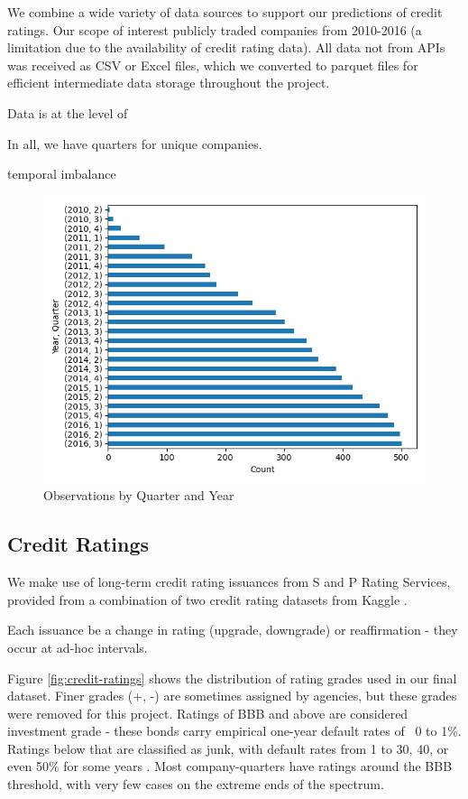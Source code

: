 \documentclass{article}
\begin{document}
    We combine a wide variety of data sources to support our predictions of credit ratings. Our scope of interest publicly traded companies from 2010-2016 (a limitation due to the availability of credit rating data). All data not from APIs was received as CSV or Excel files, which we converted to parquet files for efficient intermediate data storage throughout the project.

    Data is at the level of

    In all, we have \numQuarters \space quarters for \numCompanies \space unique companies.

    temporal imbalance

    \begin{figure}[h!]
		\centering
        \caption{Observations by Quarter and Year}
        \includegraphics[width=0.5\linewidth,keepaspectratio=true]{../Output/All Data EDA/Tabular EDA/all_data_fixed_quarter_dates_obs_by_year_quarter_no_title.png}
	\end{figure}

    \subsection*{Credit Ratings}

    We make use of long-term credit rating issuances from S and P Rating Services, provided from a combination of two credit rating datasets from Kaggle \citep{gewerc_corporate_2020,makwana_corporate_2022}.

    Each issuance be a change in rating (upgrade, downgrade) or reaffirmation - they occur at ad-hoc intervals.

    Figure \ref{fig:credit-ratings} shows the distribution of rating grades used in our final dataset. Finer grades (+, -) are sometimes assigned by agencies, but these grades were removed for this project. Ratings of BBB and above are considered investment grade - these bonds carry empirical one-year default rates of ~0 to 1\%. Ratings below that are classified as junk, with default rates from 1 to 30, 40, or even 50\% for some years \citep{s_and_p_global_ratings_s_2024}. Most company-quarters have ratings around the BBB threshold, with very few cases on the extreme ends of the spectrum.
\end{document}
